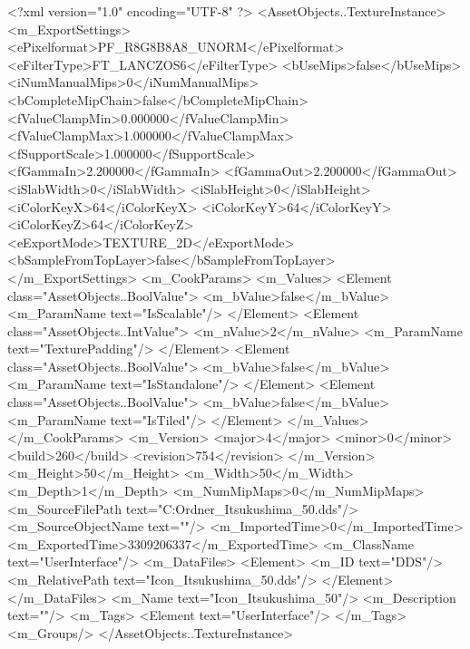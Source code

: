 <?xml version="1.0" encoding="UTF-8" ?>
<AssetObjects..TextureInstance>
	<m_ExportSettings>
		<ePixelformat>PF_R8G8B8A8_UNORM</ePixelformat>
		<eFilterType>FT_LANCZOS6</eFilterType>
		<bUseMips>false</bUseMips>
		<iNumManualMips>0</iNumManualMips>
		<bCompleteMipChain>false</bCompleteMipChain>
		<fValueClampMin>0.000000</fValueClampMin>
		<fValueClampMax>1.000000</fValueClampMax>
		<fSupportScale>1.000000</fSupportScale>
		<fGammaIn>2.200000</fGammaIn>
		<fGammaOut>2.200000</fGammaOut>
		<iSlabWidth>0</iSlabWidth>
		<iSlabHeight>0</iSlabHeight>
		<iColorKeyX>64</iColorKeyX>
		<iColorKeyY>64</iColorKeyY>
		<iColorKeyZ>64</iColorKeyZ>
		<eExportMode>TEXTURE_2D</eExportMode>
		<bSampleFromTopLayer>false</bSampleFromTopLayer>
	</m_ExportSettings>
	<m_CookParams>
		<m_Values>
			<Element class="AssetObjects..BoolValue">
				<m_bValue>false</m_bValue>
				<m_ParamName text="IsScalable"/>
			</Element>
			<Element class="AssetObjects..IntValue">
				<m_nValue>2</m_nValue>
				<m_ParamName text="TexturePadding"/>
			</Element>
			<Element class="AssetObjects..BoolValue">
				<m_bValue>false</m_bValue>
				<m_ParamName text="IsStandalone"/>
			</Element>
			<Element class="AssetObjects..BoolValue">
				<m_bValue>false</m_bValue>
				<m_ParamName text="IsTiled"/>
			</Element>
		</m_Values>
	</m_CookParams>
	<m_Version>
		<major>4</major>
		<minor>0</minor>
		<build>260</build>
		<revision>754</revision>
	</m_Version>
	<m_Height>50</m_Height>
	<m_Width>50</m_Width>
	<m_Depth>1</m_Depth>
	<m_NumMipMaps>0</m_NumMipMaps>
	<m_SourceFilePath text="C:\Users\Carola\Desktop\Neuer Ordner\Icon_Itsukushima_50.dds"/>
	<m_SourceObjectName text=""/>
	<m_ImportedTime>0</m_ImportedTime>
	<m_ExportedTime>3309206337</m_ExportedTime>
	<m_ClassName text="UserInterface"/>
	<m_DataFiles>
		<Element>
			<m_ID text="DDS"/>
			<m_RelativePath text="Icon_Itsukushima_50.dds"/>
		</Element>
	</m_DataFiles>
	<m_Name text="Icon_Itsukushima_50"/>
	<m_Description text=""/>
	<m_Tags>
		<Element text="UserInterface"/>
	</m_Tags>
	<m_Groups/>
</AssetObjects..TextureInstance>

 
